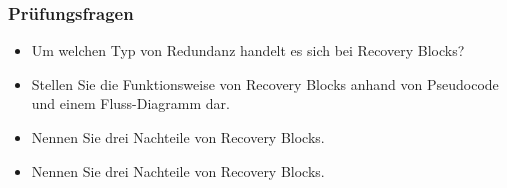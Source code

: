 \subsubsection*{Prüfungsfragen}

\begin{itemize}
	\item Um welchen Typ von Redundanz handelt es sich bei Recovery Blocks?
	\item Stellen Sie die Funktionsweise von Recovery Blocks anhand von Pseudocode und einem Fluss-Diagramm dar.
	\item Nennen Sie drei Nachteile von Recovery Blocks.
\end{itemize}

\begin{itemize}
	\item Nennen Sie drei Nachteile von Recovery Blocks.
\end{itemize}

